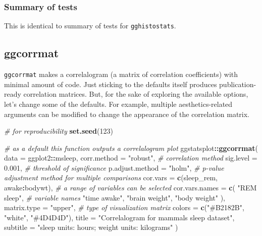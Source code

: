 \documentclass[
]{article}
\newenvironment{Shaded}{\begin{snugshade}}{\end{snugshade}}
\newcommand{\CommentTok}[1]{\textcolor[rgb]{0.56,0.35,0.01}{\textit{#1}}}
\newcommand{\DataTypeTok}[1]{\textcolor[rgb]{0.13,0.29,0.53}{#1}}
\newcommand{\DecValTok}[1]{\textcolor[rgb]{0.00,0.00,0.81}{#1}}
\newcommand{\FloatTok}[1]{\textcolor[rgb]{0.00,0.00,0.81}{#1}}
\newcommand{\KeywordTok}[1]{\textcolor[rgb]{0.13,0.29,0.53}{\textbf{#1}}}
\newcommand{\NormalTok}[1]{#1}
\newcommand{\OperatorTok}[1]{\textcolor[rgb]{0.81,0.36,0.00}{\textbf{#1}}}
\newcommand{\StringTok}[1]{\textcolor[rgb]{0.31,0.60,0.02}{#1}}
\begin{document}
\hypertarget{summary-of-tests-6}{%
\subsubsection{Summary of tests}\label{summary-of-tests-6}}

This is identical to summary of tests for \texttt{gghistostats}.

\hypertarget{ggcorrmat}{%
\subsection{ggcorrmat}\label{ggcorrmat}}

\texttt{ggcorrmat} makes a correlalogram (a matrix of correlation coefficients) with
minimal amount of code. Just sticking to the defaults itself produces
publication-ready correlation matrices. But, for the sake of exploring the
available options, let's change some of the defaults. For example, multiple
aesthetics-related arguments can be modified to change the appearance of the
correlation matrix.

\begin{Shaded}
\begin{Highlighting}[]
\CommentTok{\# for reproducibility}
\KeywordTok{set.seed}\NormalTok{(}\DecValTok{123}\NormalTok{)}

\CommentTok{\# as a default this function outputs a correlalogram plot}
\NormalTok{ggstatsplot}\OperatorTok{::}\KeywordTok{ggcorrmat}\NormalTok{(}
  \DataTypeTok{data =}\NormalTok{ ggplot2}\OperatorTok{::}\NormalTok{msleep,}
  \DataTypeTok{corr.method =} \StringTok{"robust"}\NormalTok{, }\CommentTok{\# correlation method}
  \DataTypeTok{sig.level =} \FloatTok{0.001}\NormalTok{, }\CommentTok{\# threshold of significance}
  \DataTypeTok{p.adjust.method =} \StringTok{"holm"}\NormalTok{, }\CommentTok{\# p{-}value adjustment method for multiple comparisons}
  \DataTypeTok{cor.vars =} \KeywordTok{c}\NormalTok{(sleep\_rem, awake}\OperatorTok{:}\NormalTok{bodywt), }\CommentTok{\# a range of variables can be selected}
  \DataTypeTok{cor.vars.names =} \KeywordTok{c}\NormalTok{(}
    \StringTok{"REM sleep"}\NormalTok{, }\CommentTok{\# variable names}
    \StringTok{"time awake"}\NormalTok{,}
    \StringTok{"brain weight"}\NormalTok{,}
    \StringTok{"body weight"}
\NormalTok{  ),}
  \DataTypeTok{matrix.type =} \StringTok{"upper"}\NormalTok{, }\CommentTok{\# type of visualization matrix}
  \DataTypeTok{colors =} \KeywordTok{c}\NormalTok{(}\StringTok{"\#B2182B"}\NormalTok{, }\StringTok{"white"}\NormalTok{, }\StringTok{"\#4D4D4D"}\NormalTok{),}
  \DataTypeTok{title =} \StringTok{"Correlalogram for mammals sleep dataset"}\NormalTok{,}
  \DataTypeTok{subtitle =} \StringTok{"sleep units: hours; weight units: kilograms"}
\NormalTok{)}
\end{Highlighting}
\end{Shaded}
\end{document}

